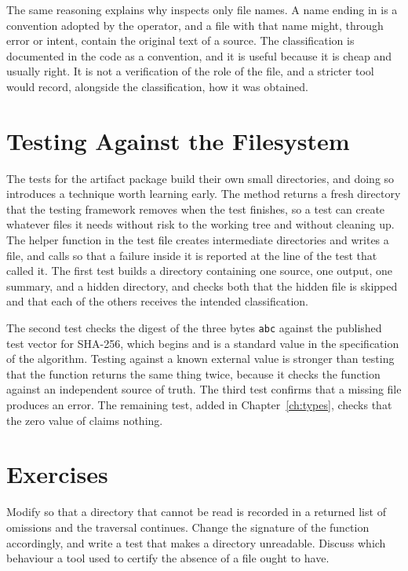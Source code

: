 The same reasoning explains why  inspects only file names. A name ending in  is a convention adopted by the operator, and a file with that name might, through error or intent, contain the original text of a source. The classification is documented in the code as a convention, and it is useful because it is cheap and usually right. It is not a verification of the role of the file, and a stricter tool would record, alongside the classification, how it was obtained.

\section{Testing Against the Filesystem}

The tests for the artifact package build their own small directories, and doing so introduces a technique worth learning early. The method  returns a fresh directory that the testing framework removes when the test finishes, so a test can create whatever files it needs without risk to the working tree and without cleaning up. The helper function  in the test file creates intermediate directories and writes a file, and calls  so that a failure inside it is reported at the line of the test that called it. The first test builds a directory containing one source, one output, one summary, and a hidden directory, and checks both that the hidden file is skipped and that each of the others receives the intended classification.


The second test checks the digest of the three bytes \texttt{abc} against the published test vector for SHA-256, which begins  and is a standard value in the specification of the algorithm. Testing against a known external value is stronger than testing that the function returns the same thing twice, because it checks the function against an independent source of truth. The third test confirms that a missing file produces an error. The remaining test, added in Chapter~\ref{ch:types}, checks that the zero value of  claims nothing.

\section*{Exercises}

\begin{exercise}
Modify  so that a directory that cannot be read is recorded in a returned list of omissions and the traversal continues. Change the signature of the function accordingly, and write a test that makes a directory unreadable. Discuss which behaviour a tool used to certify the absence of a file ought to have.
\end{exercise}

